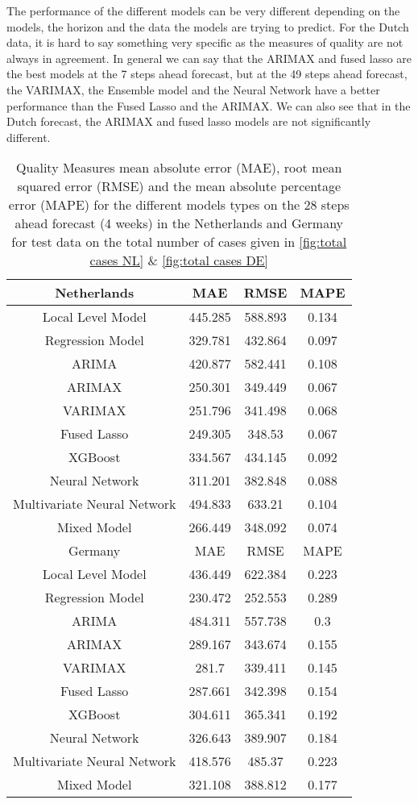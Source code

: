 The performance of the different models can be very different depending on the models, the horizon and the data the models are trying to predict. For the Dutch data, it is hard to say something very specific as the measures of quality are not always in agreement. In general we can say that the ARIMAX and fused lasso are the best models at the 7 steps ahead forecast, but at the 49 steps ahead forecast, the VARIMAX, the Ensemble model and the Neural Network have a better performance than the Fused Lasso and the ARIMAX. We can also see that in the Dutch forecast, the ARIMAX and fused lasso models are not significantly different.\\

\begin{table}[]
    \centering
    \begin{tabular}{|c|c c c|}\hline
        Netherlands & MAE & RMSE & MAPE\\\hline
        Local Level Model & 445.285 & 588.893 & 0.134\\
        Regression Model & 329.781 & 432.864 & 0.097\\
        ARIMA & 420.877 & 582.441 & 0.108\\
        ARIMAX & 250.301 & 349.449 & 0.067\\
        VARIMAX & 251.796 & 341.498 & 0.068\\
        Fused Lasso & 249.305 & 348.53 & 0.067\\
        XGBoost & 334.567 & 434.145 & 0.092\\
        Neural Network & 311.201 & 382.848 & 0.088\\
        Multivariate Neural Network & 494.833 & 633.21 & 0.104\\
        Mixed Model & 266.449 & 348.092 & 0.074\\\hline\hline
        Germany & MAE & RMSE & MAPE\\\hline
        Local Level Model & 436.449 & 622.384 & 0.223\\
        Regression Model & 230.472 & 252.553 & 0.289\\
        ARIMA & 484.311 & 557.738 & 0.3\\
        ARIMAX & 289.167 & 343.674 & 0.155\\
        VARIMAX & 281.7 & 339.411 & 0.145\\
        Fused Lasso & 287.661 & 342.398 & 0.154\\
        XGBoost & 304.611 & 365.341 & 0.192\\
        Neural Network & 326.643 & 389.907 & 0.184\\
        Multivariate Neural Network & 418.576 & 485.37 & 0.223\\
        Mixed Model & 321.108 & 388.812 & 0.177\\\hline
    \end{tabular}
    \caption{Quality Measures mean absolute error (MAE), root mean squared error (RMSE) and the mean absolute percentage error (MAPE) for the different models types on the 28 steps ahead forecast (4 weeks) in the Netherlands and Germany for test data on the total number of cases given in \autoref{fig:total cases NL} \& \ref{fig:total cases DE}}
    \label{tab:4 weeks ahead}
\end{table}
